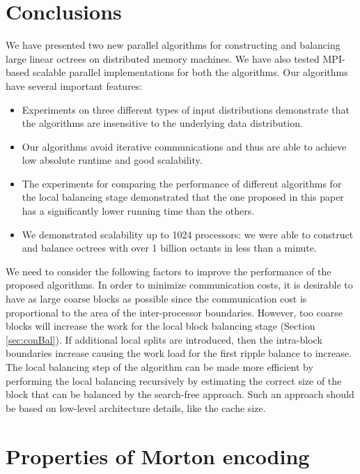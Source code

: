 \section{Conclusions}
\label{sec:conclude}
We have presented two new parallel algorithms for constructing and
balancing large linear octrees on distributed memory machines. We have
also tested MPI-based scalable parallel implementations for both the
algorithms.  Our algorithms have several important features:
\begin{itemize}
\item Experiments on three different types of input distributions
demonstrate that the algorithms are insensitive to the underlying data
distribution.
\item Our algorithms avoid iterative communications and thus are able
to achieve low absolute runtime and good scalability.
\item The experiments for comparing the performance of different
algorithms for the local balancing stage demonstrated that the one
proposed in this paper has a significantly lower running time than the
others.
\item We demonstrated scalability up to 1024 processors: we were able
to construct and balance octrees with over 1 billion octants in less
than a minute.
\end{itemize}

We need to consider the following factors to improve the performance
of the proposed algorithms. In order to minimize communication costs,
it is desirable to have as large coarse blocks as possible since the
communication cost is proportional to the area of the inter-processor
boundaries. However, too coarse blocks will increase the work for the
local block balancing stage (Section \ref{sec:conBal}). If additional
local splits are introduced, then the intra-block boundaries increase
causing the work load for the first ripple balance to increase. The
local balancing step of the algorithm can be made more efficient by
performing the local balancing recursively by estimating the correct
size of the block that can be balanced by the search-free
approach. Such an approach should be based on low-level architecture
details, like the cache size. %

\section{Properties of Morton encoding}
\label{app:prop}

